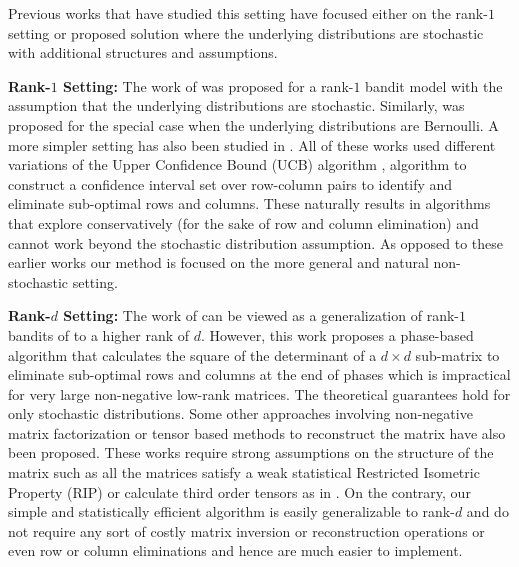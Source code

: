 Previous works that have studied this setting have focused either on the rank-$1$ setting or proposed solution where the underlying distributions are stochastic with additional structures and assumptions.

\textbf{Rank-$1$ Setting:} The work of \citet{katariya2016stochastic} was proposed for a rank-$1$ bandit model with the assumption that the underlying distributions are stochastic. Similarly, \citet{katariya2017bernoulli} was proposed for the special case when the underlying distributions are Bernoulli.  A more simpler setting has also been studied in \citet{maillard2014latent}. All of these works used different variations of the Upper Confidence Bound (UCB) algorithm \cite{auer2002finite}, \citep{auer2010ucb} algorithm to construct a confidence interval set over row-column pairs to identify and eliminate sub-optimal rows and columns. These naturally results in algorithms that explore conservatively (for the sake of row and column elimination) and cannot work beyond the stochastic distribution assumption. As opposed to these earlier works our method is focused on the more general and natural non-stochastic setting.



\textbf{Rank-$d$ Setting:} The work of \citet{kveton2017stochastic} can be viewed as a generalization of rank-$1$ bandits of \citet{katariya2016stochastic} to a higher rank of $d$. However, this work proposes a phase-based algorithm that calculates the square of the determinant of a $d\times d$ sub-matrix to eliminate sub-optimal rows and columns at the end of phases which is impractical for very large non-negative low-rank matrices. The theoretical guarantees hold for only stochastic distributions. Some other approaches involving non-negative matrix factorization \citet{sen2016contextual} or tensor based methods \citep{gopalan2016low} to reconstruct the matrix have also been proposed. These works require strong assumptions on the structure of the matrix such as all the matrices satisfy a weak statistical Restricted Isometric Property (RIP) or calculate third order tensors as in \citet{anandkumar2014tensor}. On the contrary, our simple and statistically efficient algorithm is easily generalizable to rank-$d$ and do not require any sort of costly matrix inversion or reconstruction operations or even row or column eliminations and hence are much easier to implement. 


